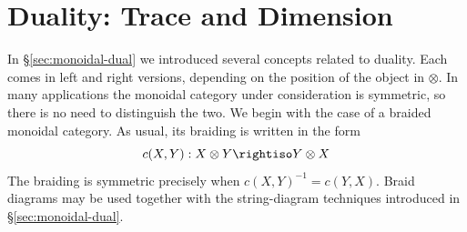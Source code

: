 
\section{Duality: Trace and Dimension}\label{sec:symm-monoidal-dual}
\hypertarget{o014.aljabr2.chapter9.trace-and-dimension}{ }
In \S\ref{sec:monoidal-dual} we introduced several concepts related to
duality. Each comes in left and right versions, depending on the position of
the object in $\otimes$. In many applications the monoidal category under
consideration is symmetric, so there is no need to distinguish the two. We
begin with the case of a braided monoidal category. As usual, its braiding is
written in the form
\[ c(X,Y): X \otimes Y \rightiso Y \otimes X \]
The braiding is symmetric precisely when $c(X,Y)^{-1}=c(Y,X)$. Braid diagrams
may be used together with the string-diagram techniques introduced in
\S\ref{sec:monoidal-dual}.

